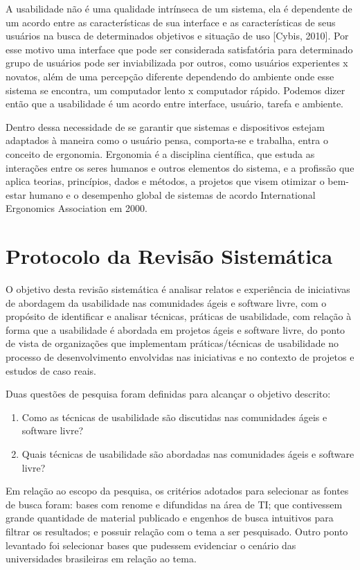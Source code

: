 \documentclass[12pt]{article}
\begin{document}
A usabilidade não é uma qualidade intrínseca de um sistema, ela é dependente de um acordo entre as características de sua interface e as características de seus usuários na busca de determinados objetivos e situação de uso [Cybis, 2010]. Por esse motivo uma interface que pode ser considerada satisfatória para determinado grupo de usuários pode ser inviabilizada por outros, como usuários experientes x novatos, além de uma percepção diferente dependendo do ambiente onde esse sistema se encontra, um computador lento x computador rápido. Podemos dizer então que a usabilidade é um acordo entre interface, usuário, tarefa e ambiente.
%

Dentro dessa necessidade de se garantir que sistemas e dispositivos estejam adaptados à maneira como o usuário pensa, comporta-se e trabalha, entra o conceito de ergonomia. Ergonomia é a disciplina científica, que estuda as interações entre os seres humanos e outros elementos do sistema, e a profissão que aplica teorias, princípios, dados e métodos, a projetos que visem otimizar o bem-estar humano e o desempenho global de sistemas de acordo International Ergonomics Association em 2000.

\section{Protocolo da Revisão Sistemática}
\label{sec:pro_rev_sis}

O objetivo desta revisão sistemática é analisar relatos e experiência de iniciativas de abordagem da usabilidade nas comunidades ágeis e software livre, com o propósito de identificar e analisar técnicas, práticas de usabilidade, com relação à forma que a usabilidade é abordada em projetos ágeis e software livre, do ponto de vista de organizações que implementam práticas/técnicas de usabilidade no processo de desenvolvimento envolvidas nas iniciativas e no contexto de projetos e estudos de caso reais.
%

Duas questões de pesquisa foram definidas para alcançar o objetivo descrito:

\begin{enumerate}
\item Como as técnicas de usabilidade são discutidas nas comunidades ágeis e software livre?
\item Quais técnicas de usabilidade são abordadas nas comunidades ágeis e software livre?
\end{enumerate}

Em relação ao escopo da pesquisa, os critérios adotados para selecionar as fontes de busca foram: bases com renome e difundidas na área de TI; que contivessem grande quantidade de material publicado e engenhos de busca intuitivos para filtrar os resultados; e possuir relação com o tema a ser pesquisado. Outro ponto levantado foi selecionar bases que pudessem evidenciar o cenário das universidades brasileiras em relação ao tema.
\end{document}
